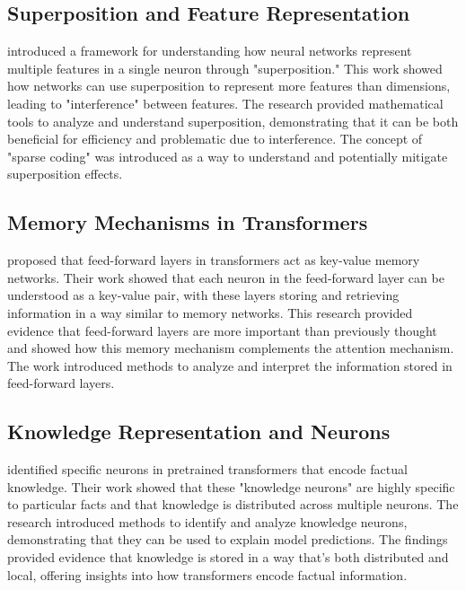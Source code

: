 \subsection{Superposition and Feature Representation}

\citet{elhage2022toy} introduced a framework for understanding how neural networks represent multiple features in a single neuron through "superposition." This work showed how networks can use superposition to represent more features than dimensions, leading to "interference" between features. The research provided mathematical tools to analyze and understand superposition, demonstrating that it can be both beneficial for efficiency and problematic due to interference. The concept of "sparse coding" was introduced as a way to understand and potentially mitigate superposition effects.

\subsection{Memory Mechanisms in Transformers}

\citet{geva2021memory} proposed that feed-forward layers in transformers act as key-value memory networks. Their work showed that each neuron in the feed-forward layer can be understood as a key-value pair, with these layers storing and retrieving information in a way similar to memory networks. This research provided evidence that feed-forward layers are more important than previously thought and showed how this memory mechanism complements the attention mechanism. The work introduced methods to analyze and interpret the information stored in feed-forward layers.

\subsection{Knowledge Representation and Neurons}

\citet{dai2022knowledge} identified specific neurons in pretrained transformers that encode factual knowledge. Their work showed that these "knowledge neurons" are highly specific to particular facts and that knowledge is distributed across multiple neurons. The research introduced methods to identify and analyze knowledge neurons, demonstrating that they can be used to explain model predictions. The findings provided evidence that knowledge is stored in a way that's both distributed and local, offering insights into how transformers encode factual information.

